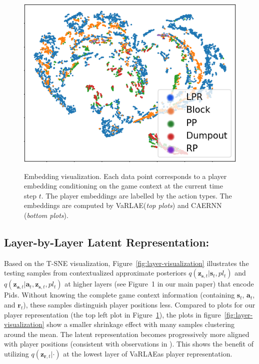 \documentclass{article}
\newcommand{\latentvariables}{\mathbf{z}}
\newcommand{\state}{\mathbf{s}}
\newcommand{\action}{\mathbf{a}}
\newcommand{\reward}{\boldsymbol{r}}
\newcommand{\player}{pl}
\newcommand{\system}{VaRLAE\;}
\begin{document}
\begin{figure}[!htbp]
    {{\includegraphics[width=0.32\columnwidth]{./figures/embedding-visualization-caernn-action-d.png} }}%
    \caption{Embedding visualization. Each data point corresponds to a player embedding conditioning on the game context at the current  time step $t$.  
    The player embeddings are labelled by the action types. The embeddings are computed by \system ({\it top plots}) and CAERNN ({\it bottom plots}).} 
    \label{fig:embedding-visualization}%
\end{figure}

\subsection{Layer-by-Layer Latent Representation:}
Based on the T-SNE visualization, Figure~\ref{fig:layer-visualization} illustrates the testing samples from contextualized approximate posteriors $q(\latentvariables_{\state,t}|\state_{t},\player_{t})$ and $q(\latentvariables_{\action,t}|\action_{t},\latentvariables_{\state,t}, \player_{t})$ at higher layers (see Figure~1 in our main paper) that encode Pids. 
Without knowing the complete game context information (containing $\state_{t}$, $\action_{t}$, and $\reward_{t}$), these samples distinguish player positions less. Compared to plots for our player representation (the top left plot in Figure~\ref{fig:embedding-visualization}), the plots in figure~\ref{fig:layer-visualization} show a smaller shrinkage effect with many samples clustering around the mean. The latent representation becomes progressively more aligned with player positions 
(consistent with observations in \cite{SonderbyLadderVAE16}). This shows the benefit of utilizing $q(\latentvariables_{\reward,t}|\cdot)$ at the lowest layer of \system as player representation.
\end{document}
